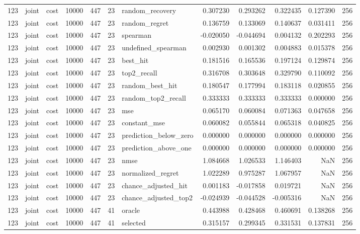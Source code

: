 \begin{tabular}{rllrrrlrrrrr}
123 & joint & cost & 10000 & 447 & 23 & random_recovery & 0.307230 & 0.293262 & 0.322435 & 0.127390 & 256 \\
123 & joint & cost & 10000 & 447 & 23 & random_regret & 0.136759 & 0.133069 & 0.140637 & 0.031411 & 256 \\
123 & joint & cost & 10000 & 447 & 23 & spearman & -0.020050 & -0.044694 & 0.004132 & 0.202293 & 256 \\
123 & joint & cost & 10000 & 447 & 23 & undefined_spearman & 0.002930 & 0.001302 & 0.004883 & 0.015378 & 256 \\
123 & joint & cost & 10000 & 447 & 23 & best_hit & 0.181516 & 0.165536 & 0.197124 & 0.129874 & 256 \\
123 & joint & cost & 10000 & 447 & 23 & top2_recall & 0.316708 & 0.303648 & 0.329790 & 0.110092 & 256 \\
123 & joint & cost & 10000 & 447 & 23 & random_best_hit & 0.180547 & 0.177994 & 0.183118 & 0.020855 & 256 \\
123 & joint & cost & 10000 & 447 & 23 & random_top2_recall & 0.333333 & 0.333333 & 0.333333 & 0.000000 & 256 \\
123 & joint & cost & 10000 & 447 & 23 & mse & 0.065170 & 0.060084 & 0.071363 & 0.047658 & 256 \\
123 & joint & cost & 10000 & 447 & 23 & constant_mse & 0.060082 & 0.055844 & 0.065318 & 0.040825 & 256 \\
123 & joint & cost & 10000 & 447 & 23 & prediction_below_zero & 0.000000 & 0.000000 & 0.000000 & 0.000000 & 256 \\
123 & joint & cost & 10000 & 447 & 23 & prediction_above_one & 0.000000 & 0.000000 & 0.000000 & 0.000000 & 256 \\
123 & joint & cost & 10000 & 447 & 23 & nmse & 1.084668 & 1.026533 & 1.146403 & NaN & 256 \\
123 & joint & cost & 10000 & 447 & 23 & normalized_regret & 1.022289 & 0.975287 & 1.067957 & NaN & 256 \\
123 & joint & cost & 10000 & 447 & 23 & chance_adjusted_hit & 0.001183 & -0.017858 & 0.019721 & NaN & 256 \\
123 & joint & cost & 10000 & 447 & 23 & chance_adjusted_top2 & -0.024939 & -0.044528 & -0.005316 & NaN & 256 \\
123 & joint & cost & 10000 & 447 & 41 & oracle & 0.443988 & 0.428468 & 0.460691 & 0.138268 & 256 \\
123 & joint & cost & 10000 & 447 & 41 & selected & 0.315157 & 0.299345 & 0.331531 & 0.137831 & 256 \\

\end{tabular}
